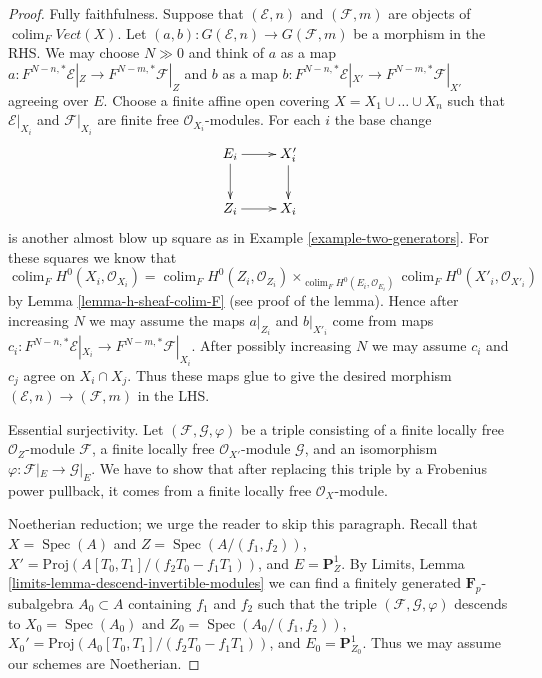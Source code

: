 \documentclass[10pt,a4paper]{amsart}
\theoremstyle{plain}
\theoremstyle{definition}
\theoremstyle{remark}
\numberwithin{equation}{subsection}
\def\colim{\mathop{\mathrm{colim}}\nolimits}
\def\Spec{\mathop{\mathrm{Spec}}}
\begin{document}
\begin{proof}
Fully faithfulness. Suppose that $(\mathcal{E}, n)$ and
$(\mathcal{F}, m)$ are objects of $\colim_F \textit{Vect}(X)$.
Let $(a, b) : G(\mathcal{E}, n) \to G(\mathcal{F}, m)$
be a morphism in the RHS. We may choose $N \gg 0$ and
think of $a$ as a map
$a : F^{N - n, *}\mathcal{E}|_Z \to F^{N - m, *}\mathcal{F}|_Z$
and $b$ as a map
$b : F^{N - n, *}\mathcal{E}|_{X'} \to F^{N - m, *}\mathcal{F}|_{X'}$
agreeing over $E$.
Choose a finite affine open covering
$X = X_1 \cup \ldots \cup X_n$ such that $\mathcal{E}|_{X_i}$
and $\mathcal{F}|_{X_i}$ are finite free $\mathcal{O}_{X_i}$-modules.
For each $i$ the base change
$$
\xymatrix{
E_i \ar[r] \ar[d] & X'_i \ar[d] \\
Z_i \ar[r] & X_i
}
$$
is another almost blow up square as in Example \ref{example-two-generators}.
For these squares we know that
$$
\colim_F H^0(X_i, \mathcal{O}_{X_i}) =
\colim_F H^0(Z_i, \mathcal{O}_{Z_i})
\times_{\colim_F H^0(E_i, \mathcal{O}_{E_i})}
\colim_F H^0(X'_i, \mathcal{O}_{X'_i})
$$
by Lemma \ref{lemma-h-sheaf-colim-F} (see proof of the lemma).
Hence after increasing $N$ we may assume
the maps $a|_{Z_i}$ and $b|_{X'_i}$ come from
maps $c_i : F^{N - n, *}\mathcal{E}|_{X_i} \to F^{N - m, *}\mathcal{F}|_{X_i}$.
After possibly increasing $N$ we may assume $c_i$ and $c_j$
agree on $X_i \cap X_j$. Thus these maps glue to give the
desired morphism $(\mathcal{E}, n) \to (\mathcal{F}, m)$
in the LHS.

\medskip\noindent
Essential surjectivity. Let $(\mathcal{F}, \mathcal{G}, \varphi)$ be a
triple consisting of
a finite locally free $\mathcal{O}_Z$-module $\mathcal{F}$,
a finite locally free $\mathcal{O}_{X'}$-module $\mathcal{G}$, and
an isomorphism $\varphi : \mathcal{F}|_E \to \mathcal{G}|_E$.
We have to show that after replacing this triple by a Frobenius
power pullback, it comes from a finite locally free $\mathcal{O}_X$-module.

\medskip\noindent
Noetherian reduction; we urge the reader to skip this paragraph.
Recall that $X = \Spec(A)$ and $Z = \Spec(A/(f_1, f_2))$,
$X' = \text{Proj}(A[T_0, T_1]/(f_2T_0 - f_1T_1))$, and
$E = \mathbf{P}^1_Z$. By Limits, Lemma
\ref{limits-lemma-descend-invertible-modules}
we can find a finitely generated $\mathbf{F}_p$-subalgebra
$A_0 \subset A$ containing $f_1$ and $f_2$ such that the triple
$(\mathcal{F}, \mathcal{G}, \varphi)$ descends to
$X_0 = \Spec(A_0)$ and $Z_0 = \Spec(A_0/(f_1, f_2))$,
$X_0' = \text{Proj}(A_0[T_0, T_1]/(f_2T_0 - f_1T_1))$, and
$E_0 = \mathbf{P}^1_{Z_0}$. Thus we may assume our schemes
are Noetherian.


\end{proof}
\end{document}

